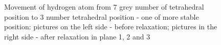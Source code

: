 \documentclass[11pt]{article}
\begin{document}
\begin{figure}[H]
\begin{minipage}[h]{0.5\linewidth}
\end{minipage}
\vfill
\begin{minipage}[h]{0.5\linewidth}
\end{minipage}
\hfill
\begin{minipage}[h]{0.5\linewidth}
\end{minipage}
\caption{Movement of hydrogen atom from 7 grey number of tetrahedral position to 3 number tetrahedral position - one of more stable position: pictures on the left side - before relaxation; pictures in the right side - after relaxation in plane 1, 2 and 3}
\label{7to3}
\end{figure}
\end{document}
